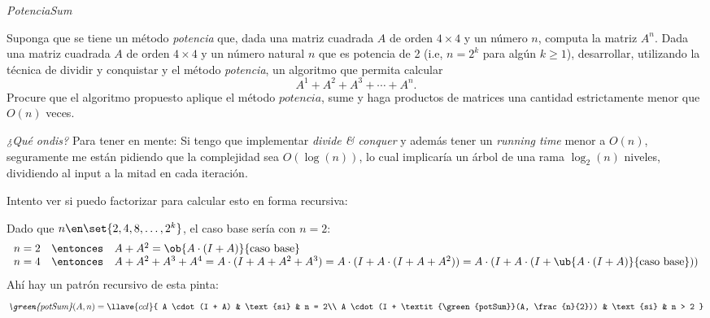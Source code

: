 
\begin{enunciado}{\ejercicio[PotenciaSum]}
  \textit{PotenciaSum}

  Suponga que se tiene un método \textit{potencia} que, dada una matriz cuadrada $A$ de orden $4 \times 4$ y un número $n$,
  computa la matriz $A^n$. Dada una matriz cuadrada $A$ de orden $4 \times 4$ y un número natural $n$ que es potencia de 2
  (i.e, $n = 2^k$ para algún $k \geq 1$), desarrollar, utilizando la técnica de dividir y conquistar y el método \textit{potencia},
  un algoritmo que permita calcular
  $$
    A^1 + A^2 + A^3 + \cdots + A^n.
  $$
  Procure que el algoritmo propuesto aplique el método $potencia$, sume y haga productos de matrices una cantidad estrictamente menor que
  $O(n)$ veces.
\end{enunciado}

\textit{¿Qué ondis?}
Para tener en mente: Si tengo que implementar \textit{divide \& conquer} y además tener un \textit{running time} menor a $O(n)$,
seguramente me están pidiendo que la complejidad sea $O(\log(n))$, lo cual implicaría un árbol de una rama $\log_2(n)$ niveles, dividiendo
al input a la mitad en cada iteración.

Intento ver si puedo factorizar para calcular esto en forma recursiva:

Dado que $n \en \set{2, 4, 8, \ldots, 2^k}$, el caso base sería con $n = 2$:
{\small
$$
  \begin{array}{rcl}
    n = 2 & \entonces & A + A^2 = \ob{A \cdot (I + A)}{\text{caso base}} \\
    n = 4 & \entonces &
    A + A^2 + A^3 + A^4 =
    A \cdot (I + A + A^2 + A^3) =
    A \cdot (I + A \cdot (I + A + A^2)) =
    A \cdot (I + A \cdot (I + \ub{A \cdot (I + A)}{\text{caso base}}))
  \end{array}
$$
}
Ahí hay un patrón recursivo de esta pinta:
$$
  \textit{\green{potSum}}(A, n) =
  \llave{ccl}{
    A \cdot (I + A) & \text{si} & n = 2\\
    A \cdot (I + \textit{\green{potSum}}(A, \frac{n}{2})) & \text{si} & n > 2
  }
$$

